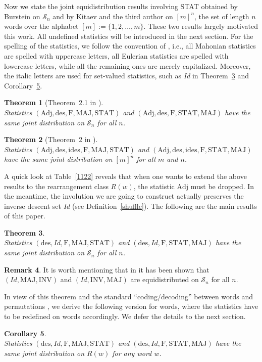 \documentclass[12pt]{amsart}
\numberwithin{equation}{section}
\theoremstyle{plain}
\newtheorem{theorem}{Theorem}[section]
\newtheorem{corollary}[theorem]{Corollary}
\theoremstyle{definition}
\newtheorem{remark}[theorem]{Remark}
\def\INV{\mathrm{INV}}
\def\MAJ{\mathrm{MAJ}}
\def\STAT{\mathrm{STAT}}
\def\F{\mathrm{F}}
\def\des{\mathrm{des}}
\def\ides{\mathrm{ides}}
\def\Adj{\mathrm{Adj}}
\def\SS{\mathcal{S}}
\begin{document}
Now we state the joint equidistribution results involving STAT obtained by Burstein \cite{Bur} on $\SS_n$ and by Kitaev and the third author \cite{KV} on $[m]^n$, the set of length $n$ words over the alphabet $[m]:=\{1,2,\ldots,m\}$. These two results largely motivated this work. All undefined statistics will be introduced in the next section. For the spelling of the statistics, we follow the convention of \cite{CSZ}, i.e., all Mahonian statistics are spelled with uppercase letters, all Eulerian statistics are spelled with lowercase letters, while all the remaining ones are merely capitalized. Moreover, the italic letters are used for set-valued statistics, such as {\it Id} in Theorem~\ref{main-Sn} and Corollary~\ref{main-Rw}.
\begin{theorem}[Theorem~2.1 in \cite{Bur}]\label{thm-Bur}$\ $\\
Statistics $(\Adj, \des, \F, \MAJ, \STAT)$ and
$(\Adj, \des, \F, \STAT, \MAJ)$ have the same joint distribution on $\SS_n$ for all $n$.
\end{theorem}
\begin{theorem}[Theorem~2 in \cite{KV}]\label{The2}$\ $\\
Statistics $(\Adj, \des, \ides, \F, \MAJ, \STAT)$ and
$(\Adj, \des, \ides, \F, \STAT, \MAJ)$ have the same joint distribution on $[m]^n$ for all $m$ and $n$.
\end{theorem}

A quick look at Table~\ref{1122} reveals that when one wants to extend the above results to the rearrangement class $R(w)$, the statistic $\Adj$ must be dropped. In the meantime, the involution we are going to construct actually preserves the inverse descent set {\it Id} (see Definition~\ref{shuffle}). The following are the main results of this paper.

\begin{theorem}\label{main-Sn}$\ $\\
Statistics $(\des, Id, \F, \MAJ, \STAT)$ and
$(\des, Id, \F, \STAT, \MAJ)$ have the same joint distribution on $\SS_n$ for all $n$.
\end{theorem}
\begin{remark}
It is worth mentioning that in \cite{FS} it has been shown that $(Id, \MAJ, \INV)$ and
$(Id, \INV, \MAJ)$ are equidistributed on $\SS_n$ for all $n$.
\end{remark}

In view of this theorem and the standard ``coding/decoding'' between words and permutations \cite{CSZ}, we derive the following version for words, where the statistics have to be redefined on words accordingly. We defer the details to the next section.
\begin{corollary}\label{main-Rw}$\ $\\
Statistics $(\des, Id, \F, \MAJ, \STAT)$ and
$(\des, Id, \F, \STAT, \MAJ)$ have the same joint distribution on $R(w)$ for any word $w$.
\end{corollary}
\end{document}
